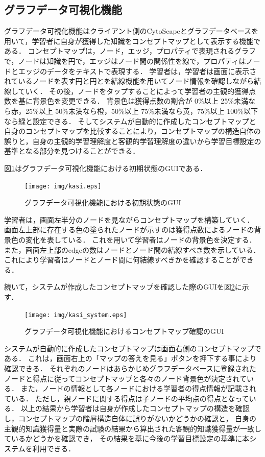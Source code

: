\subsection{グラフデータ可視化機能}\label{subsec:kasi}
グラフデータ可視化機能はクライアント側のCytoScapeとグラフデータベースを用いて，学習者に自身が獲得した知識をコンセプトマップとして表示する機能である．
コンセプトマップは，ノード，エッジ，プロパティで表現されるグラフで，ノードは知識を円で，エッジはノード間の関係性を線で，プロパティはノードとエッジのデータをテキストで表現する．
学習者は，学習者は画面に表示されているノードを表す円と円とを結線機能を用いてノード情報を確認しながら結線していく．
その後，ノードをタップすることによって学習者の主観的獲得点数を基に背景色を変更できる．
背景色は獲得点数の割合が 0\%以上 25\%未満なら赤，25\%以上 50\%未満なら橙，50\%以上 75\%未満なら黄，75\%以上 100\%以下なら緑と設定できる．
そしてシステムが自動的に作成したコンセプトマップと自身のコンセプトマップを比較することにより，コンセプトマップの構造自体の誤りと，自身の主観的学習理解度と客観的学習理解度の違いから学習目標設定の基準となる部分を見つけることができる．

図\ref{fig:kasi}はグラフデータ可視化機能における初期状態のGUIである．


\begin{figure}[htbp]
\begin{center}
\texttt{[image: img/kasi.eps]}
\end{center}
\caption{グラフデータ可視化機能における初期状態のGUI}
\label{fig:kasi}
\end{figure}

学習者は，画面左半分のノードを見ながらコンセプトマップを構築していく．
画面左上部に存在する色の塗られたノードが示すのは獲得点数によるノードの背景色の変化を表している．
これを用いて学習者はノードの背景色を決定する．
また，画面左上部のedgeの数はノードとノード間の結線すべき数を示している．
これにより学習者はノードとノード間に何結線すべきかを確認することができる．

続いて，システムが作成したコンセプトマップを確認した際のGUIを図\ref{fig:kasi_system}に示す．

\begin{figure}[htbp]
\begin{center}
\texttt{[image: img/kasi\_system.eps]}
\end{center}
\caption{グラフデータ可視化機能におけるコンセプトマップ確認のGUI}
\label{fig:kasi_system}
\end{figure}

システムが自動的に作成したコンセプトマップは画面右側のコンセプトマップである．
これは，画面右上の「マップの答えを見る」ボタンを押下する事により確認できる．
それぞれのノードはあらかじめグラフデータベースに登録されたノードと得点に従ってコンセプトマップと各々のノード背景色が決定されている．
また，ノードの情報として各ノードにおける学習者の得点情報が記載されている．
ただし，親ノードに関する得点は子ノードの平均点の得点となっている．
以上の結果から学習者は自身が作成したコンセプトマップの構造を確認し，コンセプトマップの階層構造自体に誤りがないかどうかの確認と，
自身の主観的知識獲得量と実際の試験の結果から算出された客観的知識獲得量が一致しているかどうかを確認でき，
その結果を基に今後の学習目標設定の基準に本システムを利用できる．
\newpage
